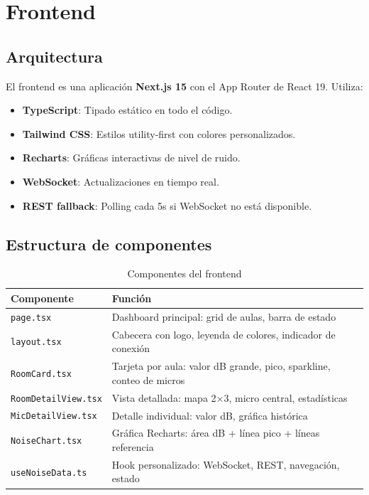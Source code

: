 \documentclass[12pt,a4paper]{report}
\begin{document}
\chapter{Frontend}

\section{Arquitectura}

El frontend es una aplicaci\'on \textbf{Next.js 15} con el App Router de React 19. Utiliza:

\begin{itemize}
    \item \textbf{TypeScript}: Tipado est\'atico en todo el c\'odigo.
    \item \textbf{Tailwind CSS}: Estilos utility-first con colores personalizados.
    \item \textbf{Recharts}: Gr\'aficas interactivas de nivel de ruido.
    \item \textbf{WebSocket}: Actualizaciones en tiempo real.
    \item \textbf{REST fallback}: Polling cada 5s si WebSocket no est\'a disponible.
\end{itemize}

\section{Estructura de componentes}

\begin{table}[H]
\centering
\begin{tabularx}{\textwidth}{lX}
\toprule
\textbf{Componente} & \textbf{Funci\'on} \\
\midrule
\texttt{page.tsx} & Dashboard principal: grid de aulas, barra de estado \\
\texttt{layout.tsx} & Cabecera con logo, leyenda de colores, indicador de conexi\'on \\
\texttt{RoomCard.tsx} & Tarjeta por aula: valor dB grande, pico, sparkline, conteo de micros \\
\texttt{RoomDetailView.tsx} & Vista detallada: mapa 2$\times$3, micro central, estad\'isticas \\
\texttt{MicDetailView.tsx} & Detalle individual: valor dB, gr\'afica hist\'orica \\
\texttt{NoiseChart.tsx} & Gr\'afica Recharts: \'area dB + l\'inea pico + l\'ineas referencia \\
\texttt{useNoiseData.ts} & Hook personalizado: WebSocket, REST, navegaci\'on, estado \\
\bottomrule
\end{tabularx}
\caption{Componentes del frontend}
\end{table}
\end{document}
